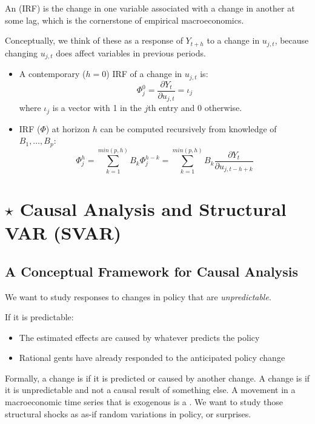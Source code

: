         An  (IRF) is the change in one variable associated with a change in another at some lag, which is the cornerstone of empirical macroeconomics.

        Conceptually, we think of these as a response of $Y_{t+h}$ to a change in $u_{j,t}$, because changing $u_{j,t}$ does affect variables in previous periods.

        \begin{itemize}
            \item A contemporary ($h=0$) IRF of a change in $u_{j,t}$ is:
            \begin{equation*}
                \Phi_j^0 = \frac{\partial Y_t}{\partial u_{j,t}} = \iota_j
            \end{equation*}
            where $\iota_j$ is a vector with 1 in the $j$th entry and 0 otherwise.
            \item IRF ($\Phi$) at horizon $h$ can be computed recursively from knowledge of $B_1,\dots, B_p$:
            \begin{equation*}
            \Phi_j^h = \sum_{k=1}^{min(p,h)} B_k \Phi_j^{h-k} = \sum_{k=1}^{min(p,h)} B_k \frac{\partial Y_t}{\partial u_{j,t-h+k}}
            \end{equation*}
        \end{itemize}

\section{$\star$ Causal Analysis and Structural VAR (SVAR)}

    \subsection{A Conceptual Framework for Causal Analysis}

        We want to study responses to changes in policy that are \emph{unpredictable}.
        
        If it is predictable:
        \begin{itemize}
            \item The estimated effects are caused by whatever predicts the policy
            \item Rational gents have already responded to the anticipated policy change
        \end{itemize}

        Formally, a change is  if it is predicted or caused by another change. A change is  if it is unpredictable and not a causal result of something else. A movement in a macroeconomic time series that is exogenous is a . We want to study those structural shocks as as-if random variations in policy, or surprises.


